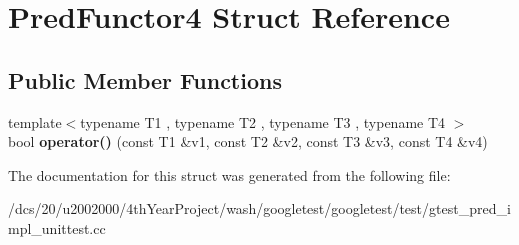 \hypertarget{structPredFunctor4}{}\section{Pred\+Functor4 Struct Reference}
\label{structPredFunctor4}
\subsection*{Public Member Functions}
\begin{DoxyCompactItemize}
\item 
\mbox{\label{structPredFunctor4_a6cfb6ccd9a66bf93d9c43a49575e3869}} 
{\footnotesize template$<$typename T1 , typename T2 , typename T3 , typename T4 $>$ }\\bool {\bfseries operator()} (const T1 \&v1, const T2 \&v2, const T3 \&v3, const T4 \&v4)
\end{DoxyCompactItemize}


The documentation for this struct was generated from the following file\+:\begin{DoxyCompactItemize}
\item 
/dcs/20/u2002000/4th\+Year\+Project/wash/googletest/googletest/test/gtest\+\_\+pred\+\_\+impl\+\_\+unittest.\+cc\end{DoxyCompactItemize}
